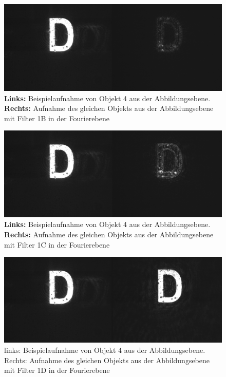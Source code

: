 \begin{figure}
	\centering
	\includegraphics[width=0.7\linewidth]{images/example10_Filter1B.png}
	\caption{
		\textbf{Links:} Beispielaufnahme von Objekt 4 aus der Abbildungsebene.\\
		\textbf{Rechts:} Aufnahme des gleichen Objekts aus der Abbildungsebene mit Filter 1B in der Fourierebene}
	\label{fig:example10_Filter1B}
\end{figure}

\begin{figure}
	\centering
	\includegraphics[width=0.7\linewidth]{images/example11_Filter1C.png}
	\caption{
		\textbf{Links:} Beispielaufnahme von Objekt 4 aus der Abbildungsebene.\\
		\textbf{Rechts:} Aufnahme des gleichen Objekts aus der Abbildungsebene mit Filter 1C in der Fourierebene
	}
	\label{fig:example11_Filter1C}
\end{figure}

\begin{figure}
	\centering
	\includegraphics[width=0.7\linewidth]{images/example12_Filter1D.png}
	\caption{links: Beispielaufnahme von Objekt 4 aus der Abbildungsebene. Rechts: Aufnahme des gleichen Objekts aus der Abbildungsebene mit Filter 1D in der Fourierebene}
	\label{fig:example12_Filter1D}
\end{figure}


